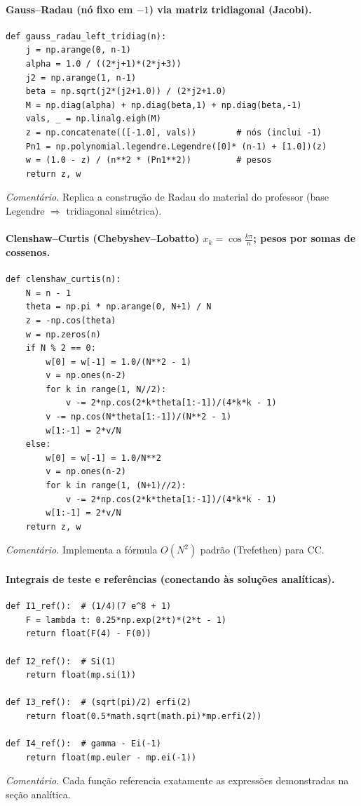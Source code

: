 \documentclass[12pt,a4paper]{article}
\begin{document}
\paragraph{Gauss–Radau (nó fixo em $-1$) via matriz tridiagonal (Jacobi).}
\begin{verbatim}
def gauss_radau_left_tridiag(n):
    j = np.arange(0, n-1)
    alpha = 1.0 / ((2*j+1)*(2*j+3))
    j2 = np.arange(1, n-1)
    beta = np.sqrt(j2*(j2+1.0)) / (2*j2+1.0)
    M = np.diag(alpha) + np.diag(beta,1) + np.diag(beta,-1)
    vals, _ = np.linalg.eigh(M)
    z = np.concatenate(([-1.0], vals))        # nós (inclui -1)
    Pn1 = np.polynomial.legendre.Legendre([0]* (n-1) + [1.0])(z)
    w = (1.0 - z) / (n**2 * (Pn1**2))         # pesos
    return z, w
\end{verbatim}
\emph{Comentário.} Replica a construção de Radau do material do professor (base Legendre $\Rightarrow$ tridiagonal simétrica).

\paragraph{Clenshaw–Curtis (Chebyshev–Lobatto) $x_k=\cos\!\frac{k\pi}{n}$; pesos por somas de cossenos.}
\begin{verbatim}
def clenshaw_curtis(n):
    N = n - 1
    theta = np.pi * np.arange(0, N+1) / N
    z = -np.cos(theta)
    w = np.zeros(n)
    if N % 2 == 0:
        w[0] = w[-1] = 1.0/(N**2 - 1)
        v = np.ones(n-2)
        for k in range(1, N//2):
            v -= 2*np.cos(2*k*theta[1:-1])/(4*k*k - 1)
        v -= np.cos(N*theta[1:-1])/(N**2 - 1)
        w[1:-1] = 2*v/N
    else:
        w[0] = w[-1] = 1.0/N**2
        v = np.ones(n-2)
        for k in range(1, (N+1)//2):
            v -= 2*np.cos(2*k*theta[1:-1])/(4*k*k - 1)
        w[1:-1] = 2*v/N
    return z, w
\end{verbatim}
\emph{Comentário.} Implementa a fórmula $O(N^2)$ padrão (Trefethen) para CC.

\paragraph{Integrais de teste e referências (conectando às soluções analíticas).}
\begin{verbatim}
def I1_ref():  # (1/4)(7 e^8 + 1)
    F = lambda t: 0.25*np.exp(2*t)*(2*t - 1)
    return float(F(4) - F(0))

def I2_ref():  # Si(1)
    return float(mp.si(1))

def I3_ref():  # (sqrt(pi)/2) erfi(2)
    return float(0.5*math.sqrt(math.pi)*mp.erfi(2))

def I4_ref():  # gamma - Ei(-1)
    return float(mp.euler - mp.ei(-1))
\end{verbatim}
\emph{Comentário.} Cada função referencia exatamente as expressões demonstradas na seção analítica.
\end{document}

